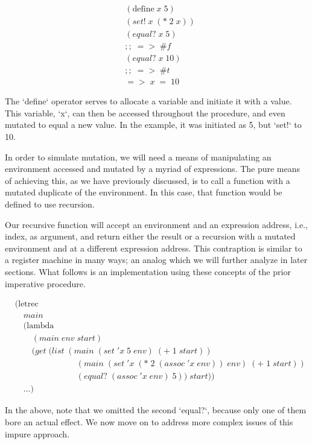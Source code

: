 \begin{align*}
& (\text{define} \; x \; 5)
\\& (set! \; x \; (* \; 2 \; x))
\\& (equal? \; x \; 5)
\\& ;; \; => \; \#f
\\& (equal? \; x \; 10)
\\& ;; \; => \; \#t
\\& => \; x \; = \; 10
\end{align*}

The `define` operator serves to allocate a variable and initiate it with a value. 
This variable, `x`, can then be accessed throughout the procedure, and even mutated 
to equal a new value. In the example, it was initiated as 5, but `set!` to 10.

In order to simulate mutation, we will need a means of manipulating an environment
accessed and mutated by a myriad of expressions. The pure means of achieving this,
as we have previously discussed, is to call a function with a mutated duplicate of
the environment. In this case, that function would be defined to use recursion.

Our recursive function will accept an environment and an expression address, i.e.,
index, as argument, and return either the result or a recursion with a mutated
environment and at a different expression address. This contraption is similar to 
a register machine in many ways; an analog which we will further analyze in later
sections. What follows is an implementation using these concepts of the prior
imperative procedure.

\begin{align*}
& (\text{letrec} \; 
\\& \quad main \; 
\\& \quad (\text{lambda} \; 
\\& \qquad (main \; env \; start)
\\& \qquad (get \; (list \; (main \; (set \; 'x \; 5 \; env) \; (+ \; 1 \; start))
\\& \qquad \qquad \qquad \quad \; (main \; (set \; 'x \; (* \; 2 \; (assoc \; 'x \; env)) \; env) \; (+ \; 1 \; start))
\\& \qquad \qquad \qquad \quad \; (equal? \; (assoc \; 'x \; env) \; 5)) \; start))
\\& \quad \dots)
\end{align*}

In the above, note that we omitted the second `equal?`, because only one of them bore
an actual effect. We now move on to address more complex issues of this impure 
approach.

